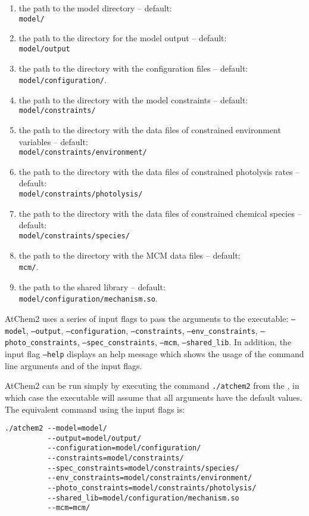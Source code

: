 \begin{enumerate}
\item the path to the model directory -- default:\\
  \texttt{model/}
\item the path to the directory for the model output -- default:\\
  \texttt{model/output}
\item the path to the directory with the configuration files -- default:\\
  \texttt{model/configuration/}.
\item the path to the directory with the model constraints -- default:\\
  \texttt{model/constraints/}
\item the path to the directory with the data files of constrained
  environment variables -- default:\\
  \texttt{model/constraints/environment/}
\item the path to the directory with the data files of constrained
  photolysis rates -- default:\\
  \texttt{model/constraints/photolysis/}
\item the path to the directory with the data files of constrained
  chemical species -- default:\\
  \texttt{model/constraints/species/}
\item the path to the directory with the MCM data files -- default:\\
  \texttt{mcm/}.
\item the path to the shared library -- default:\\
  \texttt{model/configuration/mechanism.so}.
\end{enumerate}

AtChem2 uses a series of input flags to pass the arguments to the
executable: \texttt{--model}, \texttt{--output},
\texttt{--configuration}, \texttt{--constraints},
\texttt{--env\_constraints}, \texttt{--photo\_constraints},
\texttt{--spec\_constraints}, \texttt{--mcm},
\texttt{--shared\_lib}. In addition, the input flag \texttt{--help}
displays an help message which shows the usage of the command line
arguments and of the input flags.

AtChem2 can be run simply by executing the command \verb|./atchem2|
from the \maindir, in which case the executable will assume that all
arguments have the default values. The equivalent command using the
input flags is:

\begin{verbatim}
./atchem2 --model=model/
          --output=model/output/
          --configuration=model/configuration/
          --constraints=model/constraints/
          --spec_constraints=model/constraints/species/
          --env_constraints=model/constraints/environment/
          --photo_constraints=model/constraints/photolysis/
          --shared_lib=model/configuration/mechanism.so
          --mcm=mcm/
\end{verbatim}

